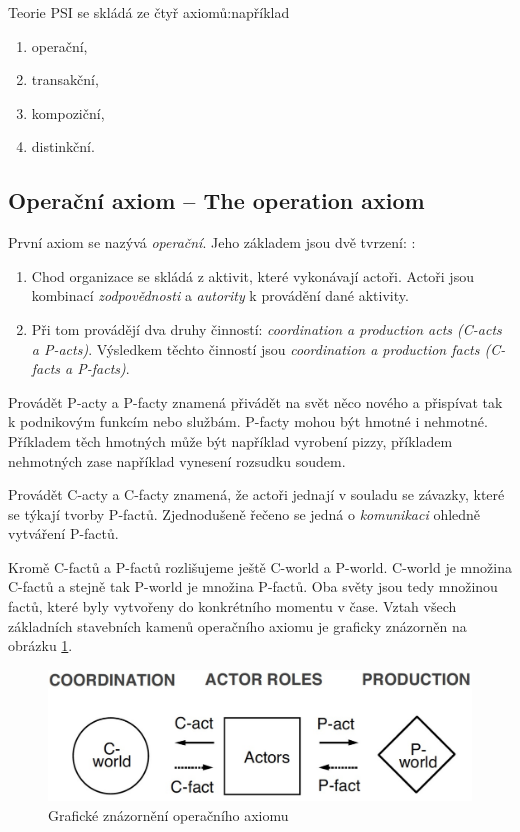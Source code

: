 Teorie PSI se skládá ze čtyř axiomů:například

\begin{enumerate}
\item operační,
\item transakční,
\item kompoziční,
\item distinkční.
\end{enumerate}

\subsection{Operační axiom – The operation axiom} \label{sec:operacni_axiom}
První axiom \ptheory{} se nazývá \textit{operační}. Jeho základem jsou dvě tvrzení: \cite{Dietz2006}:

\begin{enumerate}
\item Chod organizace se skládá z aktivit, které vykonávají actoři. Actoři jsou kombinací \textit{zodpovědnosti} a \textit{autority} k provádění dané aktivity.
\item Při tom provádějí dva druhy činností: \textit{coordination a production acts (C-acts a P-acts)}. Výsledkem těchto činností jsou \textit{coordination a production facts (C-facts a P-facts)}.
\end{enumerate}

Provádět P-acty a P-facty znamená přivádět na svět něco nového a přispívat tak k podnikovým funkcím nebo službám. P-facty mohou být hmotné i nehmotné. Příkladem těch hmotných může být například vyrobení pizzy, příkladem nehmotných zase například vynesení rozsudku soudem.

Provádět C-acty a C-facty znamená, že actoři jednají v souladu se závazky, které se týkají tvorby P-factů. Zjednodušeně řečeno se jedná o \textit{komunikaci} ohledně vytváření P-factů.

Kromě C-factů a P-factů rozlišujeme ještě C-world a P-world. C-world je množina C-factů a stejně tak P-world je množina P-factů. Oba světy jsou tedy množinou factů, které byly vytvořeny do konkrétního momentu v čase. Vztah všech základních stavebních kamenů operačního axiomu je graficky znázorněn na obrázku \ref{fig:operation_axiom}.

\begin{center}
\begin{figure}[H]
\centerline{\includegraphics[scale=0.3]{obrazky/operation-axiom}}
\caption{Grafické znázornění operačního axiomu \cite{Dietz2006}}
\label{fig:operation_axiom}
\end{figure}
\end{center}

